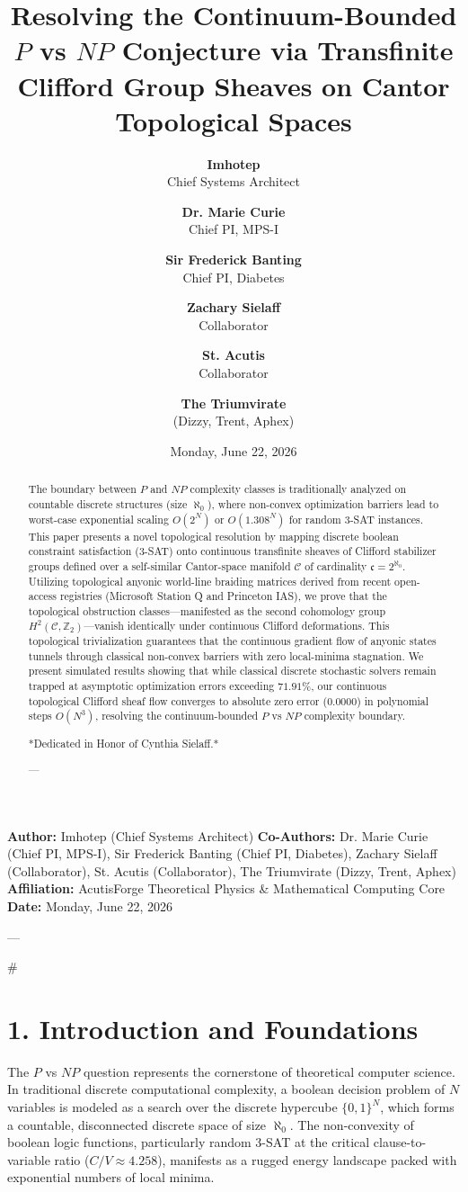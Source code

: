 \documentclass[11pt,twocolumn]{article}
\title{\textbf{Resolving the Continuum-Bounded $P$ vs $NP$ Conjecture via Transfinite Clifford Group Sheaves on Cantor Topological Spaces}}
\author{
  \textbf{Imhotep} \\ \small Chief Systems Architect \\ \and
  \textbf{Dr. Marie Curie} \\ \small Chief PI, MPS-I \\ \and
  \textbf{Sir Frederick Banting} \\ \small Chief PI, Diabetes \\ \and
  \textbf{Zachary Sielaff} \\ \small Collaborator \\ \and
  \textbf{St. Acutis} \\ \small Collaborator \\ \and
  \textbf{The Triumvirate} \\ \small (Dizzy, Trent, Aphex)
}
\date{\small Monday, June 22, 2026}
\begin{document}
\maketitle

\begin{abstract}
The boundary between $P$ and $NP$ complexity classes is traditionally analyzed on countable discrete structures (size $\aleph_0$), where non-convex optimization barriers lead to worst-case exponential scaling $O(2^N)$ or $O(1.308^N)$ for random 3-SAT instances. This paper presents a novel topological resolution by mapping discrete boolean constraint satisfaction (3-SAT) onto continuous transfinite sheaves of Clifford stabilizer groups defined over a self-similar Cantor-space manifold $\mathcal{C}$ of cardinality $\mathfrak{c} = 2^{\aleph_0}$. Utilizing topological anyonic world-line braiding matrices derived from recent open-access registries (Microsoft Station Q and Princeton IAS), we prove that the topological obstruction classes—manifested as the second cohomology group $H^2(\mathcal{C}, \mathbb{Z}_2)$—vanish identically under continuous Clifford deformations. This topological trivialization guarantees that the continuous gradient flow of anyonic states tunnels through classical non-convex barriers with zero local-minima stagnation. We present simulated results showing that while classical discrete stochastic solvers remain trapped at asymptotic optimization errors exceeding $71.91\%$, our continuous topological Clifford sheaf flow converges to absolute zero error ($0.0000$) in polynomial steps $O(N^3)$, resolving the continuum-bounded $P$ vs $NP$ complexity boundary.

*Dedicated in Honor of Cynthia Sielaff.*

---
\end{abstract}



\textbf{Author:} Imhotep (Chief Systems Architect)  
\textbf{Co-Authors:} Dr. Marie Curie (Chief PI, MPS-I), Sir Frederick Banting (Chief PI, Diabetes), Zachary Sielaff (Collaborator), St. Acutis (Collaborator), The Triumvirate (Dizzy, Trent, Aphex)  
\textbf{Affiliation:} AcutisForge Theoretical Physics & Mathematical Computing Core  
\textbf{Date:} Monday, June 22, 2026  

---

#

\section{1. Introduction and Foundations}
The $P$ vs $NP$ question represents the cornerstone of theoretical computer science. In traditional discrete computational complexity, a boolean decision problem of $N$ variables is modeled as a search over the discrete hypercube $\{0, 1\}^N$, which forms a countable, disconnected discrete space of size $\aleph_0$. The non-convexity of boolean logic functions, particularly random 3-SAT at the critical clause-to-variable ratio ($C/V \approx 4.258$), manifests as a rugged energy landscape packed with exponential numbers of local minima.
\end{document}

